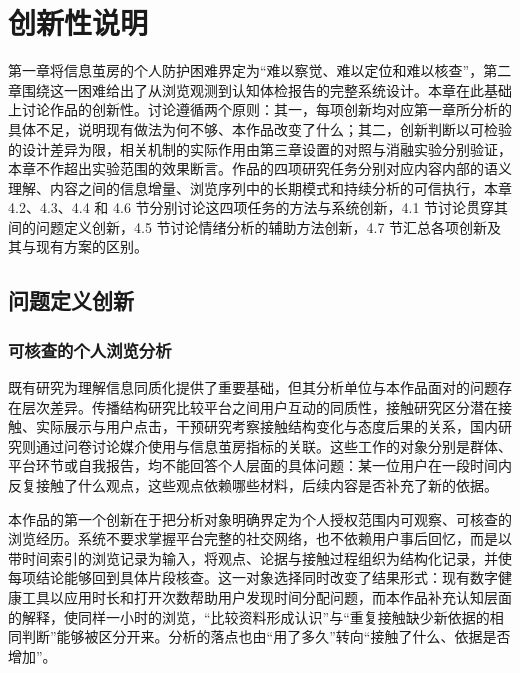 \FloatBarrier\clearpage

\section{创新性说明}\label{chapter:4}

第一章将信息茧房的个人防护困难界定为``难以察觉、难以定位和难以核查''，第二章围绕这一困难给出了从浏览观测到认知体检报告的完整系统设计。本章在此基础上讨论作品的创新性。讨论遵循两个原则：其一，每项创新均对应第一章所分析的具体不足，说明现有做法为何不够、本作品改变了什么；其二，创新判断以可检验的设计差异为限，相关机制的实际作用由第三章设置的对照与消融实验分别验证，本章不作超出实验范围的效果断言。作品的四项研究任务分别对应内容内部的语义理解、内容之间的信息增量、浏览序列中的长期模式和持续分析的可信执行，本章 4.2、4.3、4.4 和 4.6 节分别讨论这四项任务的方法与系统创新，4.1 节讨论贯穿其间的问题定义创新，4.5 节讨论情绪分析的辅助方法创新，4.7 节汇总各项创新及其与现有方案的区别。

\subsection{问题定义创新}\label{section:4.1}

\subsubsection{可核查的个人浏览分析}\label{section:4.1.1}

既有研究为理解信息同质化提供了重要基础，但其分析单位与本作品面对的问题存在层次差异。传播结构研究比较平台之间用户互动的同质性\cite{ref1}，接触研究区分潜在接触、实际展示与用户点击\cite{ref3}，干预研究考察接触结构变化与态度后果的关系\cite{ref5}，国内研究则通过问卷讨论媒介使用与信息茧房指标的关联\cite{ref6}。这些工作的对象分别是群体、平台环节或自我报告，均不能回答个人层面的具体问题：某一位用户在一段时间内反复接触了什么观点，这些观点依赖哪些材料，后续内容是否补充了新的依据。

本作品的第一个创新在于把分析对象明确界定为个人授权范围内可观察、可核查的浏览经历。系统不要求掌握平台完整的社交网络，也不依赖用户事后回忆，而是以带时间索引的浏览记录为输入，将观点、论据与接触过程组织为结构化记录，并使每项结论能够回到具体片段核查。这一对象选择同时改变了结果形式：现有数字健康工具以应用时长和打开次数帮助用户发现时间分配问题\cite{ref2}，而本作品补充认知层面的解释，使同样一小时的浏览，``比较资料形成认识''与``重复接触缺少新依据的相同判断''能够被区分开来。分析的落点也由``用了多久''转向``接触了什么、依据是否增加''。

